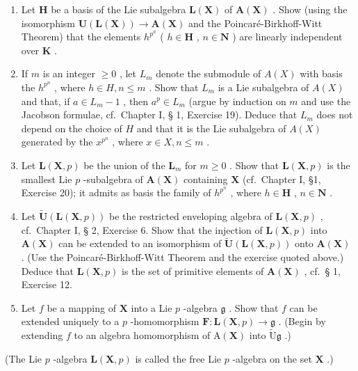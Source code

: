 \begin{enumerate}
\def\labelenumi{(\alph{enumi})}
\item
  Let \(\mathbf{H}\) be a basis of the Lie subalgebra \(\mathbf{L}(\mathbf{X})\) of \(\mathbf{A}(\mathbf{X})\) . Show (using the isomorphism \(\mathbf{U}(\mathbf{L}(\mathbf{X})) \to \mathbf{A}(\mathbf{X})\) and the Poincaré-Birkhoff-Witt Theorem) that the elements \(h^{p^n}\) ( \(h \in \mathbf{H}\) , \(n \in \mathbf{N}\) ) are linearly independent over \(\mathbf{K}\) .
\item
  If \(m\) is an integer \(\geqslant 0\) , let \(L_m\) denote the submodule of \(A(X)\) with basis the \(h^{p^n}\) , where \(h \in H, n \leqslant m\) . Show that \(L_m\) is a Lie subalgebra of \(A(X)\) and that, if \(a \in L_m - 1\) , then \(a^p \in L_m\) (argue by induction on \(m\) and use the Jacobson formulae, cf.~Chapter I, § 1, Exercise 19). Deduce that \(L_m\) does not depend on the choice of \(H\) and that it is the Lie subalgebra of \(A(X)\) generated by the \(x^{p^n}\) , where \(x \in X, n \leqslant m\) .
\item
  Let \(\mathbf{L}(\mathbf{X}, p)\) be the union of the \(\mathbf{L}_m\) for \(m \geqslant 0\) . Show that \(\mathbf{L}(\mathbf{X}, p)\) is the smallest Lie \(p\) -subalgebra of \(\mathbf{A}(\mathbf{X})\) containing \(\mathbf{X}\) (cf.~Chapter I, §1, Exercise 20); it admits as basis the family of \(h^{p^n}\) , where \(h \in \mathbf{H}\) , \(n \in \mathbf{N}\) .
\item
  Let \(\tilde{\mathbf{U}}(\mathbf{L}(\mathbf{X},p))\) be the restricted enveloping algebra of \(\mathbf{L}(\mathbf{X},p)\) , cf.~Chapter I, § 2, Exercise 6. Show that the injection of \(\mathbf{L}(\mathbf{X},p)\) into \(\mathbf{A}(\mathbf{X})\) can be extended to an isomorphism of \(\tilde{\mathbf{U}}(\mathbf{L}(\mathbf{X},p))\) onto \(\mathbf{A}(\mathbf{X})\) . (Use the Poincaré-Birkhoff-Witt Theorem and the exercise quoted above.) Deduce that \(\mathbf{L}(\mathbf{X},p)\) is the set of primitive elements of \(\mathbf{A}(\mathbf{X})\) , cf.~§ 1, Exercise 12.
\item
  Let \(f\) be a mapping of \(\mathbf{X}\) into a Lie \(p\) -algebra \(\mathfrak{g}\) . Show that \(f\) can be extended uniquely to a \(p\) -homomorphism \(\mathbf{F} \colon \mathbf{L}(\mathbf{X}, p) \to \mathfrak{g}\) . (Begin by extending \(f\) to an algebra homomorphism of \(\mathrm{A}(\mathbf{X})\) into \(\tilde{\mathrm{U}}\mathfrak{g}\) .)
\end{enumerate}

(The Lie \(p\) -algebra \(\mathbf{L}(\mathbf{X}, p)\) is called the free Lie \(p\) -algebra on the set \(\mathbf{X}\) .)

